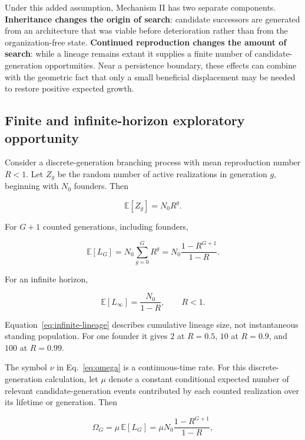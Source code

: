 \documentclass[11pt,a4paper]{article}
\begin{document}
Under this added assumption, Mechanism II has two separate components. \textbf{Inheritance changes the origin of search}: candidate successors are generated from an architecture that was viable before deterioration rather than from the organization-free state. \textbf{Continued reproduction changes the amount of search}: while a lineage remains extant it supplies a finite number of candidate-generation opportunities. Near a persistence boundary, these effects can combine with the geometric fact that only a small beneficial displacement may be needed to restore positive expected growth.

\subsection{Finite and infinite-horizon exploratory opportunity}

Consider a discrete-generation branching process with mean reproduction number $R<1$. Let $Z_g$ be the random number of active realizations in generation $g$, beginning with $N_0$ founders. Then

\[
\mathbb E[Z_g]=N_0R^g.
\]

For $G+1$ counted generations, including founders,

\begin{equation}
\mathbb E[L_G]
=
N_0\sum_{g=0}^{G}R^g
=
N_0\frac{1-R^{G+1}}{1-R}.
\label{eq:finite-lineage}
\end{equation}

For an infinite horizon,

\begin{equation}
\mathbb E[L_\infty]
=
\frac{N_0}{1-R},
\qquad R<1.
\label{eq:infinite-lineage}
\end{equation}

Equation~\eqref{eq:infinite-lineage} describes cumulative lineage size, not instantaneous standing population. For one founder it gives $2$ at $R=0.5$, $10$ at $R=0.9$, and $100$ at $R=0.99$.

The symbol $\nu$ in Eq.~\eqref{eq:omega} is a continuous-time rate. For this discrete-generation calculation, let $\mu$ denote a constant conditional expected number of relevant candidate-generation events contributed by each counted realization over its lifetime or generation. Then

\begin{equation}
\Omega_G
=
\mu\,\mathbb E[L_G]
=
\mu N_0\frac{1-R^{G+1}}{1-R},
\label{eq:omegaG}
\end{equation}
\end{document}
